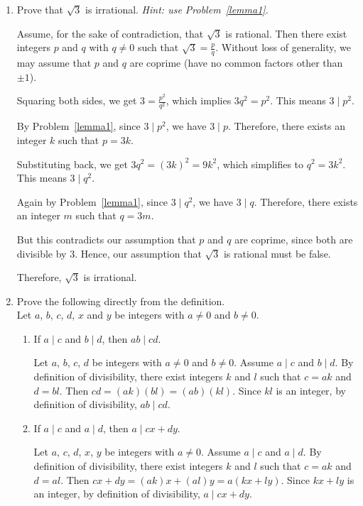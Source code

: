\begin{enumerate}
\begin{subprove}
    Hence, $3 \mid a^2$ if and only if $3 \mid a$.
  \end{subprove}

  \item Prove that $\sqrt{3}$ is irrational.  
  \textit{Hint: use Problem~\ref{lemma1}.}
  \begin{subprove}
    Assume, for the sake of contradiction, that $\sqrt{3}$ is rational.
    Then there exist integers $p$ and $q$ with $q \neq 0$ such that $\sqrt{3} = \frac{p}{q}$.
    Without loss of generality, we may assume that $p$ and $q$ are coprime (have no common factors other than $\pm 1$).
    
    Squaring both sides, we get $3 = \frac{p^2}{q^2}$, which implies $3q^2 = p^2$.
    This means $3 \mid p^2$.
    
    By Problem~\ref{lemma1}, since $3 \mid p^2$, we have $3 \mid p$.
    Therefore, there exists an integer $k$ such that $p = 3k$.
    
    Substituting back, we get $3q^2 = (3k)^2 = 9k^2$, which simplifies to $q^2 = 3k^2$.
    This means $3 \mid q^2$.
    
    Again by Problem~\ref{lemma1}, since $3 \mid q^2$, we have $3 \mid q$.
    Therefore, there exists an integer $m$ such that $q = 3m$.
    
    But this contradicts our assumption that $p$ and $q$ are coprime, since both are divisible by $3$.
    Hence, our assumption that $\sqrt{3}$ is rational must be false.
    
    Therefore, $\sqrt{3}$ is irrational.
  \end{subprove}

  \item Prove the following directly from the definition.   \\
  Let $a$, $b$, $c$, $d$, $x$ and $y$ be integers with $a \neq 0$ and $b \neq 0$.
  \begin{enumerate}
    \item If $a \mid c$ and $b \mid d$, then $ab \mid cd$.
    \begin{subprove}
      Let $a$, $b$, $c$, $d$ be integers with $a \neq 0$ and $b \neq 0$.
      Assume $a \mid c$ and $b \mid d$.
      By definition of divisibility, there exist integers $k$ and $l$ such that $c = ak$ and $d = bl$.
      Then $cd = (ak)(bl) = (ab)(kl)$.
      Since $kl$ is an integer, by definition of divisibility, $ab \mid cd$.
    \end{subprove}
    
    \item If $a \mid c$ and $a \mid d$, then $a \mid cx + dy$.
    \begin{subprove}
      Let $a$, $c$, $d$, $x$, $y$ be integers with $a \neq 0$.
      Assume $a \mid c$ and $a \mid d$.
      By definition of divisibility, there exist integers $k$ and $l$ such that $c = ak$ and $d = al$.
      Then $cx + dy = (ak)x + (al)y = a(kx + ly)$.
      Since $kx + ly$ is an integer, by definition of divisibility, $a \mid cx + dy$.
    \end{subprove}
    

\end{enumerate}
\end{enumerate}
